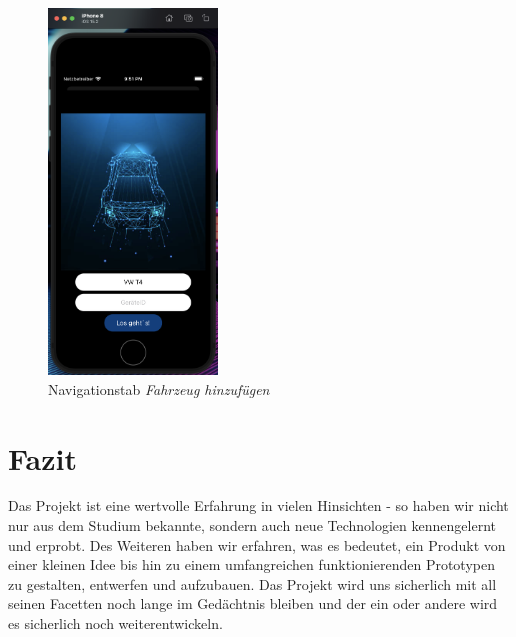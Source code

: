 \begin{figure} [H]
	\begin{center}
		\includegraphics[width=0.4\textwidth]{Bilder/iOS_addDevice.png}
		\caption{Navigationstab \textit{Fahrzeug hinzufügen}}
		\label{add}
	\end{center}
\end{figure}

\section{Fazit}
Das Projekt ist eine wertvolle Erfahrung in vielen Hinsichten - so haben wir nicht nur aus dem Studium bekannte, sondern auch neue Technologien kennengelernt und erprobt. Des Weiteren haben wir erfahren, was es bedeutet, ein Produkt von einer kleinen Idee bis hin zu einem umfangreichen funktionierenden Prototypen zu gestalten, entwerfen und aufzubauen. Das Projekt wird uns sicherlich mit all seinen Facetten noch lange im Gedächtnis bleiben und der ein oder andere wird es sicherlich noch weiterentwickeln.
